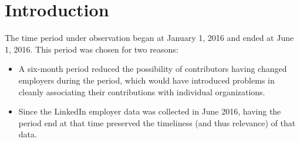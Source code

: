 \chapter{Introduction}
The time period \timeperiod{} under observation began at January 1, 2016 and ended at June 1, 2016. This period was chosen for two reasons:
\begin{itemize}
	\item A six-month period reduced the possibility of contributors having changed employers during the period, which would have introduced problems in cleanly associating their contributions with individual organizations.
	\item Since the LinkedIn employer data was collected in June 2016, having the period end at that time preserved the timeliness (and thus relevance) of that data.
\end{itemize}
